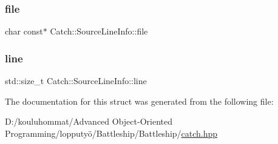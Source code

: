 \subsubsection{\texorpdfstring{file}{file}}
{\footnotesize\ttfamily char const$\ast$ Catch\+::\+Source\+Line\+Info\+::file}

\mbox{\label{struct_catch_1_1_source_line_info_a841e5d696c7b9cde24e45e61dd979c77}} 
\subsubsection{\texorpdfstring{line}{line}}
{\footnotesize\ttfamily std\+::size\+\_\+t Catch\+::\+Source\+Line\+Info\+::line}



The documentation for this struct was generated from the following file\+:\begin{DoxyCompactItemize}
\item 
D\+:/kouluhommat/\+Advanced Object-\/\+Oriented Programming/lopputyö/\+Battleship/\+Battleship/\mbox{\hyperlink{catch_8hpp}{catch.\+hpp}}\end{DoxyCompactItemize}
